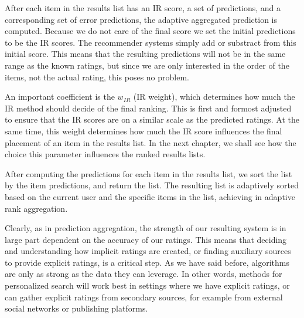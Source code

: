 After each item in the results list has an IR score, a set of predictions, and a corresponding set of 
error predictions, the adaptive aggregated prediction is computed. 
Because we do not care of the final score we set the initial predictions to be the IR scores.
The recommender systems simply add or substract from this initial score.
This means that the resulting predictions will not be in the same range as the known ratings,
but since we are only interested in the order of the items, not the actual rating, this poses no problem.

An important coefficient is the $w_{IR}$ (IR weight),
which determines how much the IR method should decide of the final ranking.
This is first and formost adjusted to ensure that the IR scores
are on a similar scale as the predicted ratings.
At the same time, this weight determines how 
much the IR score influences the final placement of an item in the results list.
In the next chapter, we shall see how the choice this parameter 
influences the ranked results lists.

After computing the predictions for each item in the results list, 
we sort the list by the item predictions, and return the list.
The resulting list is adaptively sorted based on the current user and the specific items in the list,
achieving in adaptive rank aggregation.

Clearly, as in prediction aggregation, the strength of our resulting system is in large part dependent on the accuracy of our ratings.
This means that deciding and understanding how implicit ratings are created, or 
finding auxiliary sources to provide explicit ratings, is a critical step.
As we have said before, algorithms are only as strong as the data they can leverage.
In other words, methods for personalized search will work best in settings where we have explicit ratings,
or can gather explicit ratings from secondary sources, for example from external social networks or publishing platforms.


